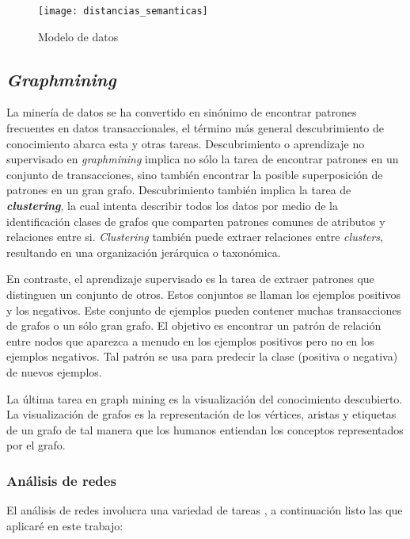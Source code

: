\begin{figure}[ht]
\caption{Modelo de datos}
\label{fig:distancias_semanticas}
\centering
\texttt{[image: distancias\_semanticas]}
\end{figure}


\subsection{\textit{Graphmining}}
La minería de datos se ha convertido en sinónimo de encontrar patrones frecuentes en datos transaccionales, el término más general descubrimiento de conocimiento abarca esta y otras tareas. Descubrimiento o aprendizaje no supervisado en \textit{graphmining} implica no sólo la tarea de encontrar patrones en un conjunto de transacciones, sino también encontrar la posible superposición de patrones en un gran grafo. Descubrimiento también implica la tarea de \textbf{\textit{clustering}}, la cual intenta describir todos los datos por medio de la identificación clases de grafos que comparten patrones comunes de atributos y relaciones entre si. \textit{Clustering} también puede extraer relaciones entre \textit{clusters}, resultando en una organización jerárquica o taxonómica.\cite{Cook2006}
 
En contraste, el aprendizaje supervisado es la tarea de extraer patrones que distinguen un conjunto de otros. Estos conjuntos se llaman los ejemplos positivos y los negativos. Este conjunto de ejemplos pueden contener muchas transacciones de grafos o un sólo gran grafo. El objetivo es encontrar un patrón de relación entre nodos que aparezca a menudo en los ejemplos positivos pero no en los ejemplos negativos. Tal patrón se usa para predecir la clase (positiva o negativa) de nuevos ejemplos. \cite{Cook2006}
 
La última tarea en graph mining es la visualización del conocimiento descubierto. La visualización de grafos es la representación de los vértices, aristas y etiquetas de un grafo de tal manera que los humanos entiendan los conceptos representados por el grafo.\cite{Cook2006}

\subsubsection{Análisis de redes}
El análisis de redes involucra una variedad de tareas \cite{Tang2010}, a continuación listo las que aplicaré en este trabajo:

